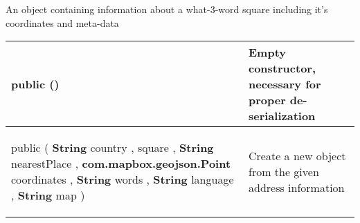  {\scriptsize An object containing information about a what{-}3{-}word square including it's coordinates and meta{-}data
 
\vspace*{-5pt} 
\begin{tabularx}{\linewidth}{X|m{}}
\label{tab:W3WAddressData}
\begin{raggedleft}public  \textbf{\hyperref[tab:W3WAddressData]{\color{blue}{W3WAddressData}}}()
\end{raggedleft} &
 Empty constructor, necessary for proper de{-}serialization\\ \hline 
\begin{raggedleft}public  \textbf{\hyperref[tab:W3WAddressData]{\color{blue}{W3WAddressData}} }(\newline \hfill 
\hspace*{ 5pt} \textbf{String} country , \newline
 \hspace*{ 5pt} \textbf{\hyperref[tab:W3WSquareData]{\color{blue}{W3WSquareData}}} square , \newline
 \hspace*{ 5pt} \textbf{String} nearestPlace , \newline
 \hspace*{ 5pt} \textbf{com.mapbox.geojson.Point} coordinates , \newline
 \hspace*{ 5pt} \textbf{String} words , \newline
 \hspace*{ 5pt} \textbf{String} language , \newline
 \hspace*{ 5pt} \textbf{String} map  )
\end{raggedleft} &
 Create a new \hyperref[tab:W3WAddressData]{\color{blue}{W3WAddressData}} object from the given address information\\\end{tabularx}
}
